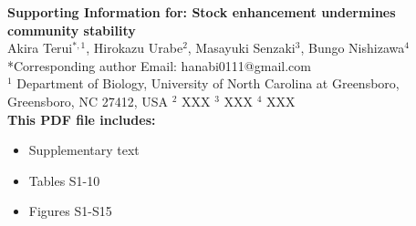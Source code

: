 \begin{flushleft}
\LARGE{\textbf{Supporting Information for: \newline Stock enhancement undermines community stability}}\\
\vspace*{\baselineskip}
\large{Akira Terui$^{*,1}$, Hirokazu Urabe$^2$, Masayuki Senzaki$^3$, Bungo Nishizawa$^4$}\\
\vspace*{1\baselineskip}
\normalsize{*Corresponding author \newline Email: hanabi0111@gmail.com}\\
\vspace*{1\baselineskip}
\normalsize{
$^1$ Department of Biology, University of North Carolina at Greensboro, Greensboro, NC 27412, USA \newline
$^2$ XXX \newline
$^3$ XXX \newline
$^4$ XXX}\\
\vspace*{2\baselineskip}
\textbf{This PDF file includes:}
\begin{itemize}
\item Supplementary text
\item Tables S1-10
\item Figures S1-S15
\end{itemize}
\end{flushleft}

\newpage